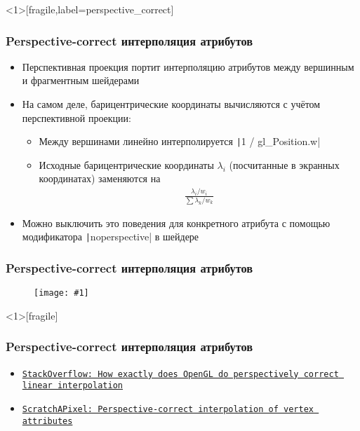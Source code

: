 \documentclass[10pt]{beamer}
\newcommand{\slideimage}[1]{
  \begin{figure}
    \begin{adjustbox}{width=\textwidth, totalheight=\textheight-2\baselineskip-2\baselineskip,keepaspectratio}
      \texttt{[image: \#1]}
    \end{adjustbox}
  \end{figure}
}
\begin{document}
\begin{frame}<1>[fragile,label=perspective_correct]
\frametitle{Perspective-correct интерполяция атрибутов}
\begin{itemize}
\item Перспективная проекция портит интерполяцию атрибутов между вершинным и фрагментным шейдерами
\pause
\item На самом деле, барицентрические координаты вычисляются с учётом перспективной проекции:
\pause
\begin{itemize}
\item Между вершинами линейно интерполируется \texttt|1 / gl_Position.w|
\pause
\item Исходные барицентрические координаты \begin{math}\lambda_i\end{math} (посчитанные в экранных координатах) заменяются на
\begin{align*}
\frac{\lambda_i / w_i}{\sum \lambda_k / w_k}
\end{align*}
\end{itemize}
\pause
\item Можно выключить это поведения для конкретного атрибута с помощью модификатора \texttt|noperspective| в шейдере
\end{itemize}
\end{frame}

\begin{frame}[fragile]
\frametitle{Perspective-correct интерполяция атрибутов}
\slideimage{perspective-correct.png}
\end{frame}


\begin{frame}<1>[fragile]
\frametitle{Perspective-correct интерполяция атрибутов}
\begin{itemize}
\item \href{https://stackoverflow.com/questions/24441631/how-exactly-does-opengl-do-perspectively-correct-linear-interpolation}{\texttt{StackOverflow: How exactly does OpenGL do perspectively correct linear interpolation}}
\item \href{https://www.scratchapixel.com/lessons/3d-basic-rendering/rasterization-practical-implementation/perspective-correct-interpolation-vertex-attributes.html}{\texttt{ScratchAPixel: Perspective-correct interpolation of vertex attributes}}
\end{itemize}
\end{frame}
\end{document}
